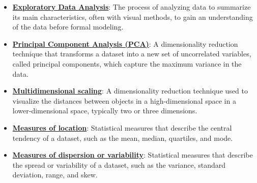 \documentclass{article}%
\begin{document}
\begin{itemize}[leftmargin=*]%
\item \href{https://purdue.brightspace.com/d2l/common/assets/pdfjs-d2l-dist/1.0.14-legacy/web/viewer.html?file=\%2Fcontent\%2Fenforced\%2F1095465-WL.202510.CS24200.LE1\%2F10L2-Vis.pdf\%3Fou\%3D1095465\&lang=en-us\&container=d2l-fileviewer-rendered-pdf\&fullscreen=d2l-fileviewer-rendered-pdf-dialog\&height=667#page=3}{\textbf{Exploratory Data Analysis}}: The process of analyzing data to summarize its main characteristics, often with visual methods, to gain an understanding of the data before formal modeling.%
\item \href{https://purdue.brightspace.com/d2l/common/assets/pdfjs-d2l-dist/1.0.14-legacy/web/viewer.html?file=\%2Fcontent\%2Fenforced\%2F1095465-WL.202510.CS24200.LE1\%2F10L2-Vis.pdf\%3Fou\%3D1095465\&lang=en-us\&container=d2l-fileviewer-rendered-pdf\&fullscreen=d2l-fileviewer-rendered-pdf-dialog\&height=667#page=4}{\textbf{Principal Component Analysis (PCA)}}: A dimensionality reduction technique that transforms a dataset into a new set of uncorrelated variables, called principal components, which capture the maximum variance in the data.%
\item \href{https://purdue.brightspace.com/d2l/common/assets/pdfjs-d2l-dist/1.0.14-legacy/web/viewer.html?file=\%2Fcontent\%2Fenforced\%2F1095465-WL.202510.CS24200.LE1\%2F10L2-Vis.pdf\%3Fou\%3D1095465\&lang=en-us\&container=d2l-fileviewer-rendered-pdf\&fullscreen=d2l-fileviewer-rendered-pdf-dialog\&height=667#page=4}{\textbf{Multidimensional scaling}}: A dimensionality reduction technique used to visualize the distances between objects in a high-dimensional space in a lower-dimensional space, typically two or three dimensions.%
\item \href{https://purdue.brightspace.com/d2l/common/assets/pdfjs-d2l-dist/1.0.14-legacy/web/viewer.html?file=\%2Fcontent\%2Fenforced\%2F1095465-WL.202510.CS24200.LE1\%2F10L2-Vis.pdf\%3Fou\%3D1095465\&lang=en-us\&container=d2l-fileviewer-rendered-pdf\&fullscreen=d2l-fileviewer-rendered-pdf-dialog\&height=667#page=5}{\textbf{Measures of location}}: Statistical measures that describe the central tendency of a dataset, such as the mean, median, quartiles, and mode.%
\item \href{https://purdue.brightspace.com/d2l/common/assets/pdfjs-d2l-dist/1.0.14-legacy/web/viewer.html?file=\%2Fcontent\%2Fenforced\%2F1095465-WL.202510.CS24200.LE1\%2F10L2-Vis.pdf\%3Fou\%3D1095465\&lang=en-us\&container=d2l-fileviewer-rendered-pdf\&fullscreen=d2l-fileviewer-rendered-pdf-dialog\&height=667#page=5}{\textbf{Measures of dispersion or variability}}: Statistical measures that describe the spread or variability of a dataset, such as the variance, standard deviation, range, and skew.%

\end{itemize}
\end{document}
